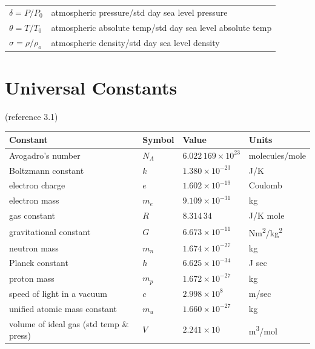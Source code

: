 \documentclass[
]{book}
\begin{document}
\begin{longtable}[]{@{}ll@{}}
\begin{minipage}[t]{0.21\columnwidth}
\(\delta = P/P_0\)\strut
\end{minipage} & \begin{minipage}[t]{0.73\columnwidth}\raggedright
atmospheric pressure/std day sea level pressure\strut
\end{minipage}\tabularnewline
\begin{minipage}[t]{0.21\columnwidth}\raggedright
\(\theta = T/T_0\)\strut
\end{minipage} & \begin{minipage}[t]{0.73\columnwidth}\raggedright
atmospheric absolute temp/std day sea level absolute temp\strut
\end{minipage}\tabularnewline
\begin{minipage}[t]{0.21\columnwidth}\raggedright
\(\sigma = \rho/\rho_ο\)\strut
\end{minipage} & \begin{minipage}[t]{0.73\columnwidth}\raggedright
atmospheric density/std day sea level density\strut
\end{minipage}\tabularnewline
\bottomrule
\end{longtable}

\hypertarget{universal-constants}{%
\section{Universal Constants}\label{universal-constants}}

(reference 3.1)

\begin{longtable}[]{@{}llll@{}}
\toprule
Constant & Symbol & Value & Units\tabularnewline
\midrule
\endhead
Avogadro's number & \(N_A\) & \(6.022\,169 \times 10^{23}\) & molecules/mole\tabularnewline
Boltzmann constant & \(k\) & \(1.380 \times 10^{-23}\) & J/K\tabularnewline
electron charge & \(e\) & \(1.602 \times 10^{-19}\) & Coulomb\tabularnewline
electron mass & \(m_e\) & \(9.109 \times 10^{-31}\) & kg\tabularnewline
gas constant & \(R\) & \(8.314\,34\) & J/K mole\tabularnewline
gravitational constant & \(G\) & \(6.673 \times 10^{-11}\) & Nm\textsuperscript{2}/kg\textsuperscript{2}\tabularnewline
neutron mass & \(m_n\) & \(1.674 \times 10^{-27}\) & kg\tabularnewline
Planck constant & \(h\) & \(6.625 \times 10^{-34}\) & J sec\tabularnewline
proton mass & \(m_p\) & \(1.672 \times 10^{-27}\) & kg\tabularnewline
speed of light in a vacuum & \(c\) & \(2.998 \times 10^8\) & m/sec\tabularnewline
unified atomic mass constant & \(m_u\) & \(1.660 \times 10^{-27}\) & kg\tabularnewline
volume of ideal gas (std temp \& press) & \(V\) & \(2.241 \times 10\) & m\textsuperscript{3}/mol\tabularnewline
\bottomrule
\end{longtable}
\end{document}
